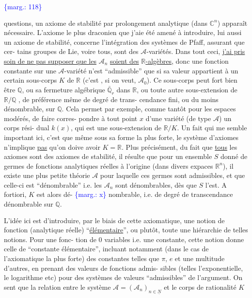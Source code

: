 \documentclass[11pt]{article}
\newcommand{\scanpage}[1]{\par\bigskip\noindent{\small\sffamily[scan #1]}\par}
\newcommand{\mspage}[1]{{\small\sffamily[p.\,#1]}}
\newcommand{\margin}[1]{\textcolor{blue}{\{\textsf{marg.:} #1\}}}
\newcommand{\uline}[1]{\underline{#1}}
\begin{document}
\margin{118}

\clearpage
\scanpage{119/119}
\mspage{41}

questions, un axiome de stabilité par prolongement analytique
(dans $\mathbb{C}^{n}$) apparaît nécessaire. L'axiome le plus draconien que
j'aie été amené à introduire, lui aussi un axiome de stabilité,
concerne l'intégration des systèmes de Pfaff, assurant que cer-%
tains groupes de Lie, voire tous, sont des $\mathcal{A}$-variétés. Dans tout
ceci, \uline{j'ai pris soin de ne pas supposer que les} $\mathcal{A}_{n}$ \uline{soient des}
\uline{$\mathbb{R}$-algèbres}, donc une fonction constante sur une $\mathcal{A}$-variété n'est
``admissible'' que si sa valeur appartient à un certain sous-corps
$K$ de $\mathbb{R}$ (c'est , si on veut, $\mathcal{A}_{0}$). Ce sous-corps peut fort bien
être $\mathbb{Q}$, ou sa fermeture algébrique $\bar{\mathbb{Q}}_{r}$ dans $\mathbb{R}$, ou toute autre
sous-extension de $\mathbb{R}/\mathbb{Q}$ , de préférence même de degré de trans-%
cendance fini, ou du moins dénombrable, sur $\mathbb{Q}$. Cela permet par
exemple, comme tantôt pour les espaces modérés, de faire corres-%
pondre à tout point $x$ d'une variété (de type $\mathcal{A}$) un corps rési-%
dual $k(x)$, qui est une sous-extension de $\mathbb{R}/K$. Un fait qui me
semble important ici, c'est que même sous sa forme la plus forte,
le système d'axiomes n'implique \uline{pas} qu'on doive avoir $K = \mathbb{R}$. Plus
précisément, du fait que \uline{tous} les axiomes sont des axiomes de
stabilité, il résulte que pour un ensemble $S$ donné de germes
de fonctions analytiques réelles à l'origine (dans divers expaces
$\mathbb{R}^{n}$), il existe une plus petite théorie $\mathcal{A}$ pour laquelle ces germes
sont admissibles, et que celle-ci est ``dénombrable'' i.e. les $\mathcal{A}_{n}$
sont dénombrables, dès que $S$ l'est. A fortiori, $K$ est alors dé-%
\margin{x} nombrable, i.e. de degré de transcendance dénombrable sur $\mathbb{Q}$.

L'idée ici est d'introduire, par le biais de cette
axiomatique, une notion de fonction (analytique réelle) ``\uline{élémentaire}'',
ou plutôt, toute une hiérarchie de telles notions. Pour une fonc-%
tion de 0 variables i.e. une constante, cette notion donne celle
de ``constante élémentaire'', incluant notamment (dans le cas de
l'axiomatique la plus forte) des constantes telles que $\pi$, $e$ et
une multitude d'autres, en prenant des valeurs de fonctions admis-%
sibles (telles l'exponentielle, le logarithme etc) pour des systèmes
de valeurs ``admissibles'' de l'argument. On sent que la relation
entre le système $\mathcal{A} = (\mathcal{A}_{n})_{n\in\underline{N}}$ et le corps de rationalité $K$
\end{document}
